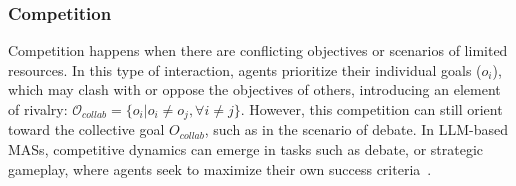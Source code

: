 \documentclass[acmsmall,nonacm]{acmart}
\begin{document}
    
        \subsubsection{Competition}
            Competition happens when there are conflicting objectives or scenarios of limited resources. In this type of interaction, agents prioritize their individual goals ($o_i$), which may clash with or oppose the objectives of others, introducing an element of rivalry: $\mathcal{O}_{collab}=\{o_i | o_i \neq o_j, \forall i \neq j \}$. However, this competition can still orient toward the collective goal $O_{collab}$, such as in the scenario of debate. In LLM-based MASs, competitive dynamics can emerge in tasks such as debate, or strategic gameplay, where agents seek to maximize their own success criteria~\cite{chen-etal-2024-llmarena,zhao2024competeai}.
\end{document}

